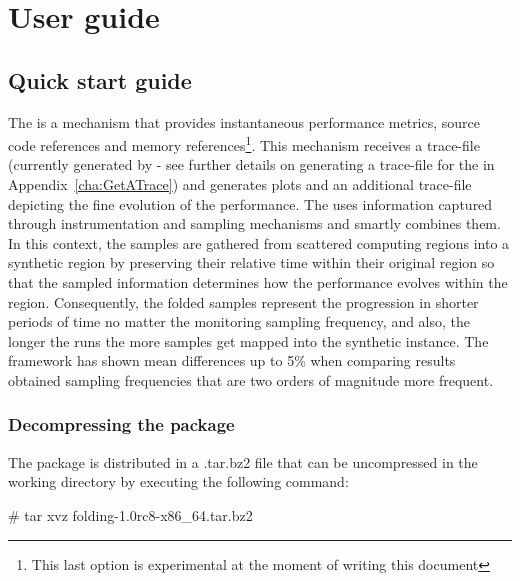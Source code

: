 
\chapter{User guide}\label{cha:UserGuide}

\section{Quick start guide}

\let\oldv\verbatim
\let\oldendv\endverbatim

\def\verbatim{\par\setbox0\vbox\bgroup\oldv}
\def\endverbatim{\oldendv\egroup\fboxsep0pt \noindent\colorbox[gray]{0.8}{\usebox0}\par}


The \FOLDING is a mechanism that provides instantaneous performance metrics, source code references and memory references\footnote{This last option is experimental at the moment of writing this document}.
This mechanism receives a trace-file (currently generated by \EXTRAE - see further details on generating a trace-file for the \FOLDING in Appendix~\ref{cha:GetATrace}) and generates plots and an additional trace-file depicting the fine evolution of the performance.
The \FOLDING uses information captured through instrumentation and sampling mechanisms and smartly combines them.
In this context, the samples are gathered from scattered computing regions into a synthetic region by preserving their relative time within their original region so that the sampled information determines how the performance evolves within the region.
Consequently, the folded samples represent the progression in shorter periods of time no matter the monitoring sampling frequency, and also, the longer the runs the more samples get mapped into the synthetic instance.
The framework has shown mean differences up to 5\% when comparing results obtained sampling frequencies that are two orders of magnitude more frequent.

\subsection{Decompressing the package}

The \FOLDING package is distributed in a .tar.bz2 file that can be uncompressed in the working directory by executing the following command:

\begin{verbatim}
# tar xvz folding-1.0rc8-x86_64.tar.bz2
\end{verbatim}

